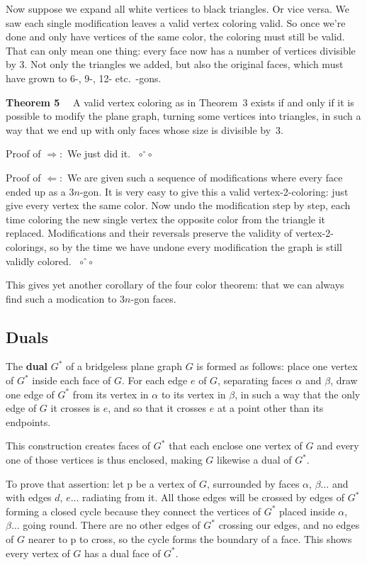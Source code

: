 \documentclass[12pt]{article}
\let\S\scriptstyle
\let\so\Longrightarrow
\let\os\Longleftarrow
\def\qed{ ${\S\circ}\!{}^\circ\!{\S\circ}$}
\begin{document}
Now suppose we expand all white vertices to black triangles. Or vice versa. We
saw each single modification leaves a valid vertex coloring valid. So once
we're done and only have vertices of the same color, the coloring must
still be valid. That can only mean one thing: every face now has a number of
vertices divisible by 3. Not only the triangles we added, but also the
original faces, which must have grown to 6-, 9-, 12- etc.\ -gons.

{\bf Theorem 5}$\quad$ A valid vertex coloring as in Theorem~3 exists if and only if it is possible to modify the plane graph, turning some vertices into triangles, in such a way that we end up with only faces whose size is divisible by~3.

Proof of $\so:$ We just did it.~\qed

Proof of $\os:$ We are given such a sequence of modifications where every face
ended up as a $3n$-gon. It is very easy to give this a valid vertex-2-coloring:
just give every vertex the same color. Now undo the modification step by step,
each time coloring the new single vertex the opposite color from the triangle
it replaced. Modifications and their reversals preserve the validity of
vertex-2-colorings, so by the time we have undone every modification the graph
is still validly colored.~\qed

This gives yet another corollary of the four color theorem: that we can always
find such a modication to $3n$-gon faces.

\vfill\pagebreak
\subsection*{Duals}

The {\bf dual} $G^*$ of a bridgeless plane graph $G$ is formed as follows:
place one vertex of $G^*$ inside each face of $G$. For each edge $e$ of $G$,
separating faces $\alpha$ and $\beta$, draw one edge of $G^*$ from its vertex
in $\alpha$ to its vertex in $\beta$, in such a way that the only edge of $G$
it crosses is $e$, and so that it crosses $e$ at a point other than its
endpoints.

This construction creates faces of $G^*$ that each enclose one vertex of $G$
and every one of those vertices is thus enclosed, making $G$ likewise a dual
of $G^*$.

To prove that assertion: let {\sc p} be a vertex of $G$, surrounded
by faces $\alpha$, $\beta\dots$ and with edges $d$, $e\dots$ radiating from
it. All those edges will be crossed by edges of $G^*$ forming a closed cycle
because they connect the vertices of $G^*$ placed inside $\alpha$, $\beta\dots$
going round. There are no other edges of $G^*$ crossing our edges, and no
edges of $G$ nearer to {\sc p} to cross, so the cycle forms the boundary of a
face. This shows every vertex of $G$ has a dual face of $G^*$.
\end{document}

